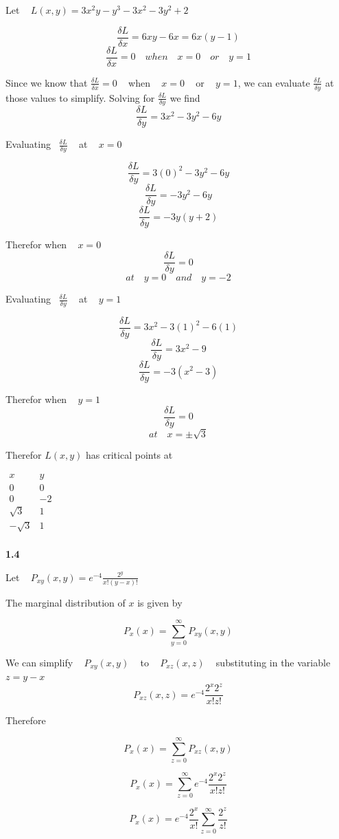 \documentclass[11pt]{article}
\begin{document}
Let ~ \(L(x,y)=3x^2y−y^3−3x^2−3y^2+2\)

 \[\frac{\delta L}{\delta x} = 6xy-6x = 6x(y-1)\]
\[\frac{\delta L}{\delta x}=0 \quad when \quad x=0 \quad or \quad y=1\]

Since we know that \(\frac{\delta L}{\delta x}=0\) ~ when ~ \(x=0\) ~ or
~ \(y=1\), we can evaluate \(\frac{\delta L}{\delta y}\) at those values
to simplify. Solving for \(\frac{\delta L}{\delta y}\) we find
\[\frac{\delta L}{\delta y} = 3x^2-3y^2-6y\]

Evaluating ~\(\frac{\delta L}{\delta y}\) ~ at ~ \(x=0\)

 \[\frac{\delta L}{\delta y} = 3(0)^2-3y^2-6y\]
\[\frac{\delta L}{\delta y} = -3y^2-6y\]
\[\frac{\delta L}{\delta y} = -3y(y+2)\]

Therefor when ~ \(x=0\) \[\frac{\delta L}{\delta y}=0\]
\[at \quad y=0 \quad and \quad y=-2\]

Evaluating ~\(\frac{\delta L}{\delta y}\) ~ at ~ \(y=1\)

 \[\frac{\delta L}{\delta y} = 3x^2-3(1)^2-6(1)\]
\[\frac{\delta L}{\delta y} = 3x^2-9\]
\[\frac{\delta L}{\delta y} = -3(x^2-3)\]

Therefor when ~ \(y=1\) \[\frac{\delta L}{\delta y}=0\]
\[at \quad x=\pm\sqrt{3}\]

Therefor \(L(x,y)\) has critical points at

\(\begin{array}{c|c} x & y\\ \hline 0 & 0\\ 0 & -2\\ \sqrt{3} & 1\\ -\sqrt{3} & 1\\ \end{array}\)

    \textbf{1.4}

    Let ~ \(P_{xy}(x,y) = e^{-4}\frac{2^y}{x!(y-x)!}\)

 The marginal distribution of \(x\) is given by

\[P_x(x)=\sum_{y=0}^{\infty}P_{xy}(x,y)\]

 We can simplify ~ \(P_{xy}(x,y)\) ~ to ~ \(P_{xz}(x,z)\) ~ substituting
in the variable ~ \(z=y-x\) \[P_{xz}(x,z) = e^{-4}\frac{2^x2^z}{x!z!}\]

Therefore

\[P_x(x)=\sum_{z=0}^{\infty}P_{xz}(x,y)\]

\[P_x(x)=\sum_{z=0}^{\infty}e^{-4}\frac{2^x2^z}{x!z!}\]

\[P_x(x)=e^{-4}\frac{2^x}{x!}\sum_{z=0}^{\infty}\frac{2^z}{z!}\]
\end{document}
